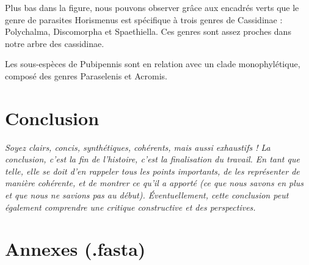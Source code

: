\documentclass[a4paper, 12pt]{article}
\begin{document}
Plus bas dans la figure, nous pouvons observer grâce aux encadrés verts que le genre de parasites Horismenus est spécifique à trois genres de Cassidinae : Polychalma, Discomorpha et Spaethiella. Ces genres sont assez proches dans notre arbre des cassidinae.

Les sous-espèces de Pubipennis sont en relation avec un clade monophylétique, composé des genres Paraselenis et Acromis.
\section{Conclusion}
\emph{Soyez clairs, concis, synthétiques, cohérents, mais aussi exhaustifs ! La conclusion, c’est la fin de l’histoire, c’est la finalisation du travail. En tant que telle, elle se doit d’en rappeler tous les points importants, de les représenter de manière cohérente, et de montrer ce qu’il a apporté (ce que nous savons en plus et que nous ne savions pas au début). Éventuellement, cette conclusion peut également comprendre une critique constructive et des perspectives.}

\printbibliography

\section{Annexes (.fasta)}
\end{document}
